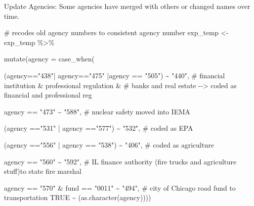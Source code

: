 \documentclass[
  letterpaper,
  DIV=11,
  numbers=noendperiod]{scrreport}
\newenvironment{Shaded}{\begin{snugshade}}{\end{snugshade}}
\newcommand{\AttributeTok}[1]{\textcolor[rgb]{0.40,0.45,0.13}{#1}}
\newcommand{\CommentTok}[1]{\textcolor[rgb]{0.37,0.37,0.37}{#1}}
\newcommand{\ConstantTok}[1]{\textcolor[rgb]{0.56,0.35,0.01}{#1}}
\newcommand{\FunctionTok}[1]{\textcolor[rgb]{0.28,0.35,0.67}{#1}}
\newcommand{\NormalTok}[1]{\textcolor[rgb]{0.00,0.23,0.31}{#1}}
\newcommand{\OtherTok}[1]{\textcolor[rgb]{0.00,0.23,0.31}{#1}}
\newcommand{\SpecialCharTok}[1]{\textcolor[rgb]{0.37,0.37,0.37}{#1}}
\newcommand{\StringTok}[1]{\textcolor[rgb]{0.13,0.47,0.30}{#1}}
\begin{document}
Update Agencies: Some agencies have merged with others or changed names
over time.

\begin{Shaded}
\begin{Highlighting}[]
\CommentTok{\# recodes old agency numbers to consistent agency number}
\NormalTok{exp\_temp }\OtherTok{\textless{}{-}}\NormalTok{ exp\_temp }\SpecialCharTok{\%\textgreater{}\%} 

  \FunctionTok{mutate}\NormalTok{(}\AttributeTok{agency =} \FunctionTok{case\_when}\NormalTok{(}

\NormalTok{    (agency}\SpecialCharTok{==}\StringTok{"438"}\SpecialCharTok{|}\NormalTok{ agency}\SpecialCharTok{==}\StringTok{"475"} \SpecialCharTok{|}\NormalTok{agency }\SpecialCharTok{==} \StringTok{"505"}\NormalTok{) }\SpecialCharTok{\textasciitilde{}} \StringTok{"440"}\NormalTok{,}
    \CommentTok{\# financial institution \&  professional regulation \&}
     \CommentTok{\# banks and real estate  {-}{-}\textgreater{} coded as  financial and professional reg}

\NormalTok{    agency }\SpecialCharTok{==} \StringTok{"473"} \SpecialCharTok{\textasciitilde{}} \StringTok{"588"}\NormalTok{, }\CommentTok{\# nuclear safety moved into IEMA}

\NormalTok{    (agency }\SpecialCharTok{==}\StringTok{"531"} \SpecialCharTok{|}\NormalTok{ agency }\SpecialCharTok{==}\StringTok{"577"}\NormalTok{) }\SpecialCharTok{\textasciitilde{}} \StringTok{"532"}\NormalTok{, }\CommentTok{\# coded as EPA}

\NormalTok{    (agency }\SpecialCharTok{==}\StringTok{"556"} \SpecialCharTok{|}\NormalTok{ agency }\SpecialCharTok{==} \StringTok{"538"}\NormalTok{) }\SpecialCharTok{\textasciitilde{}} \StringTok{"406"}\NormalTok{, }\CommentTok{\# coded as agriculture}

\NormalTok{    agency }\SpecialCharTok{==} \StringTok{"560"} \SpecialCharTok{\textasciitilde{}} \StringTok{"592"}\NormalTok{, }\CommentTok{\# IL finance authority (fire trucks and agriculture stuff)to state fire marshal}

\NormalTok{    agency }\SpecialCharTok{==} \StringTok{"570"} \SpecialCharTok{\&}\NormalTok{ fund }\SpecialCharTok{==} \StringTok{"0011"} \SpecialCharTok{\textasciitilde{}} \StringTok{"494"}\NormalTok{,   }\CommentTok{\# city of Chicago road fund to transportation}
    \ConstantTok{TRUE} \SpecialCharTok{\textasciitilde{}}\NormalTok{ (}\FunctionTok{as.character}\NormalTok{(agency)))) }
\end{Highlighting}
\end{Shaded}
\end{document}
